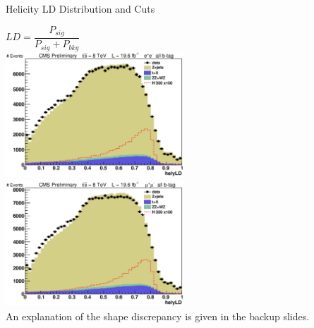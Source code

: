 \begin{frame}{Helicity LD Distribution and Cuts}
\begin{center}
$LD = \dfrac{P_{sig}}{P_{sig} + P_{bkg}}$
\\
\includegraphics[width=0.5\textwidth]{images/preselection/el/helyLD.eps}
\includegraphics[width=0.5\textwidth]{images/preselection/mu/helyLD.eps}\\
\vspace{2em}
\tiny
An explanation of the shape discrepancy is given in the backup slides.
\end{center}
\end{frame}

